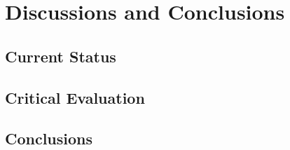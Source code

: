 \part{Discussions and Conclusions}
\chapter{Current Status}

\chapter{Critical Evaluation}

\chapter{Conclusions}

